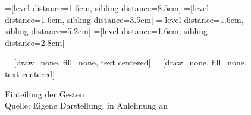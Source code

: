 \begin{figure}[!h]
    =[level distance=1.6cm, sibling distance=8.5cm]
    =[level distance=1.6cm, sibling distance=3.5cm]
    =[level distance=1.6cm, sibling distance=5.2cm]
    =[level distance=1.6cm, sibling distance=2.8cm]

     = [draw=none, fill=none, text centered]
     = [draw=none, fill=none, text centered]

    \centering
    \newline
    \caption[Einteilung der Gesten]{Einteilung der Gesten\\Quelle: Eigene Darstellung, in Anlehnung an \cite[680]{pavlovic_visual_1997}}
	\label{fig:einteilung_der_gesten}
\end{figure}
\FloatBarrier

